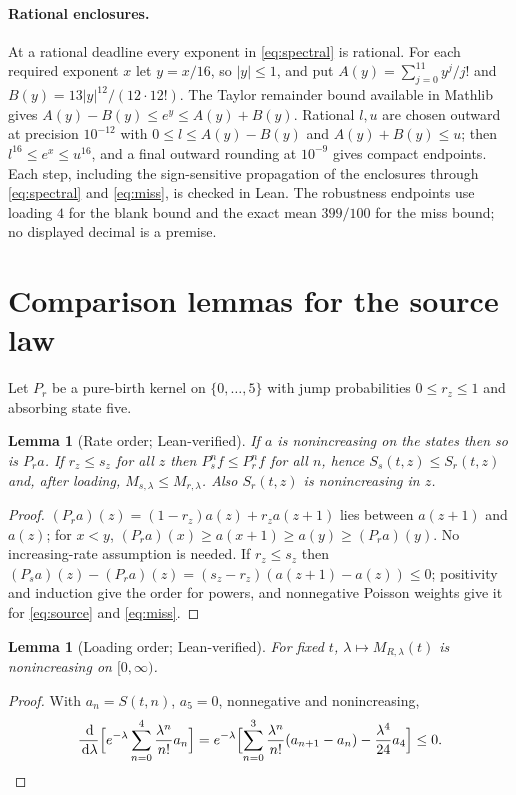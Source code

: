 \documentclass[11pt,a4paper]{article}
\theoremstyle{plain}
\newtheorem{lemma}[theorem]{Lemma}
\theoremstyle{definition}
\theoremstyle{remark}
\newcommand{\dd}{\,\mathrm d}
\begin{document}
\paragraph{Rational enclosures.} At a rational deadline every exponent in \eqref{eq:spectral} is rational. For each required exponent $x$ let $y=x/16$, so $|y|\le1$, and put $A(y)=\sum_{j=0}^{11}y^j/j!$ and $B(y)=13|y|^{12}/(12\cdot12!)$. The Taylor remainder bound available in Mathlib gives $A(y)-B(y)\le e^y\le A(y)+B(y)$. Rational $l,u$ are chosen outward at precision $10^{-12}$ with $0\le l\le A(y)-B(y)$ and $A(y)+B(y)\le u$; then $l^{16}\le e^x\le u^{16}$, and a final outward rounding at $10^{-9}$ gives compact endpoints. Each step, including the sign-sensitive propagation of the enclosures through \eqref{eq:spectral} and \eqref{eq:miss}, is checked in Lean. The robustness endpoints use loading $4$ for the blank bound and the exact mean $399/100$ for the miss bound; no displayed decimal is a premise.

\section{Comparison lemmas for the source law}\label{app:comparisons}
Let $P_r$ be a pure-birth kernel on $\{0,\dots,5\}$ with jump probabilities $0\le r_z\le1$ and absorbing state five.

\begin{lemma}[Rate order; Lean-verified]\label{lem:rateorder}
If $a$ is nonincreasing on the states then so is $P_ra$. If $r_z\le s_z$ for all $z$ then $P_s^nf\le P_r^nf$ for all $n$, hence $S_s(t,z)\le S_r(t,z)$ and, after loading, $M_{s,\lambda}\le M_{r,\lambda}$. Also $S_r(t,z)$ is nonincreasing in $z$.
\end{lemma}
\begin{proof}
$(P_ra)(z)=(1-r_z)a(z)+r_za(z+1)$ lies between $a(z+1)$ and $a(z)$; for $x<y$, $(P_ra)(x)\ge a(x+1)\ge a(y)\ge(P_ra)(y)$. No increasing-rate assumption is needed. If $r_z\le s_z$ then $(P_sa)(z)-(P_ra)(z)=(s_z-r_z)(a(z+1)-a(z))\le0$; positivity and induction give the order for powers, and nonnegative Poisson weights give it for \eqref{eq:source} and \eqref{eq:miss}.
\end{proof}

\begin{lemma}[Loading order; Lean-verified]\label{lem:loadorder}
For fixed $t$, $\lambda\mapsto M_{R,\lambda}(t)$ is nonincreasing on $[0,\infty)$.
\end{lemma}
\begin{proof}
With $a_n=S(t,n)$, $a_5=0$, nonnegative and nonincreasing,
\[
\frac{\dd}{\dd\lambda}\Bigl[e^{-\lambda}\sum_{n=0}^{4}\frac{\lambda^n}{n!}a_n\Bigr]
=e^{-\lambda}\Bigl[\sum_{n=0}^{3}\frac{\lambda^n}{n!}(a_{n+1}-a_n)-\frac{\lambda^4}{24}a_4\Bigr]\le0.\qedhere
\]
\end{proof}
\end{document}
